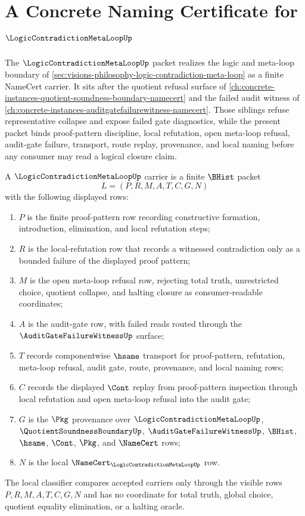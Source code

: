 \chapter{A Concrete Naming Certificate for $\LogicContradictionMetaLoopUp$}
\label{ch:concrete-instances-logiccontradictionmetaloop-namecert}

The $\LogicContradictionMetaLoopUp$ packet realizes the logic and meta-loop boundary of \autoref{sec:visions-philosophy-logic-contradiction-meta-loop} as a finite NameCert carrier. It sits after the quotient refusal surface of \autoref{ch:concrete-instances-quotient-soundness-boundary-namecert} and the failed audit witness of \autoref{ch:concrete-instances-auditgatefailurewitness-namecert}. Those siblings refuse representative collapse and expose failed gate diagnostics, while the present packet binds proof-pattern discipline, local refutation, open meta-loop refusal, audit-gate failure, transport, route replay, provenance, and local naming before any consumer may read a logical closure claim.

\begin{definition}
\label{def:logic-contradiction-meta-loop-carrier}
A $\LogicContradictionMetaLoopUp$ carrier is a finite $\BHist$ packet
$$
L=(P,R,M,A,T,C,G,N)
$$
with the following displayed rows:
\begin{enumerate}
\item $P$ is the finite proof-pattern row recording constructive formation, introduction, elimination, and local refutation steps;
\item $R$ is the local-refutation row that records a witnessed contradiction only as a bounded failure of the displayed proof pattern;
\item $M$ is the open meta-loop refusal row, rejecting total truth, unrestricted choice, quotient collapse, and halting closure as consumer-readable coordinates;
\item $A$ is the audit-gate row, with failed reads routed through the $\AuditGateFailureWitnessUp$ surface;
\item $T$ records componentwise $\hsame$ transport for proof-pattern, refutation, meta-loop refusal, audit gate, route, provenance, and local naming rows;
\item $C$ records the displayed $\Cont$ replay from proof-pattern inspection through local refutation and open meta-loop refusal into the audit gate;
\item $G$ is the $\Pkg$ provenance over $\LogicContradictionMetaLoopUp$, $\QuotientSoundnessBoundaryUp$, $\AuditGateFailureWitnessUp$, $\BHist$, $\hsame$, $\Cont$, $\Pkg$, and $\NameCert$ rows;
\item $N$ is the local $\NameCert_{\LogicContradictionMetaLoopUp}$ row.
\end{enumerate}
The local classifier compares accepted carriers only through the visible rows $P,R,M,A,T,C,G,N$ and has no coordinate for total truth, global choice, quotient equality elimination, or a halting oracle.
\end{definition}

